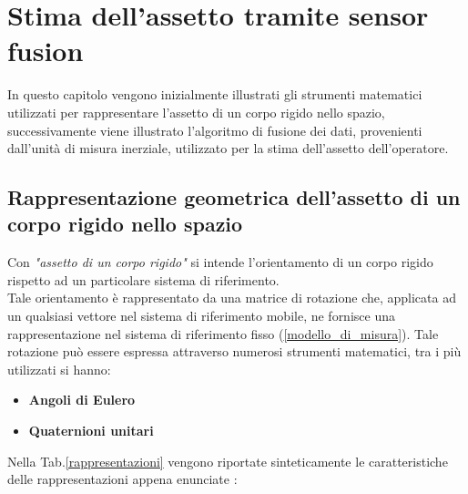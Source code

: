 \chapter{Stima dell'assetto tramite sensor fusion}
\label{elaborazione}
In questo capitolo vengono inizialmente illustrati gli strumenti matematici utilizzati per rappresentare l'assetto di un corpo rigido nello spazio,
successivamente viene illustrato l'algoritmo di fusione dei dati, provenienti dall'unità di misura inerziale, utilizzato per la stima dell'assetto dell'operatore.


\section{Rappresentazione geometrica dell'assetto di un corpo rigido nello spazio}
\label{assetto}
Con \textit{"assetto di un corpo rigido"} si intende l'orientamento di un corpo rigido rispetto ad un particolare sistema di riferimento.\\
Tale orientamento è rappresentato da una matrice di rotazione che, applicata ad un qualsiasi vettore nel sistema di riferimento mobile, ne fornisce una rappresentazione nel sistema di riferimento fisso (\ref{modello_di_misura}). 
Tale rotazione può essere espressa attraverso numerosi strumenti matematici, tra i più utilizzati si hanno:
\begin{itemize}
	\item \textbf{Angoli di Eulero}
	\item \textbf{Quaternioni unitari}
\end{itemize}

Nella Tab.\ref{rappresentazioni} vengono riportate sinteticamente le caratteristiche delle rappresentazioni appena enunciate \cite{assetto}:

